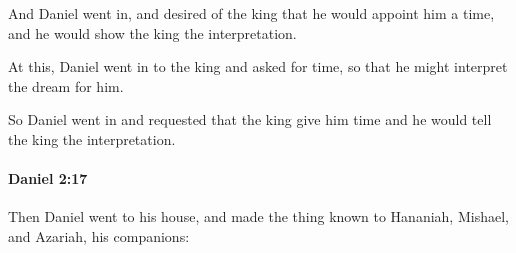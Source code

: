 			\begin{versebox}
					\item[BHS] 
					\item[LXX] 
					\item[ASV] And Daniel went in, and desired of the king that he would appoint him a time, and he would show the king the interpretation.
					\item[NIV] At this, Daniel went in to the king and asked for time, so that he might interpret the dream for him.
					\item[NRSV] So Daniel went in and requested that the king give him time and he would tell the king the interpretation.
			\end{versebox}

		\paragraph{Daniel 2:17} %
			\label{DANIEL-2-17}

			Then Daniel went to his house, and made the thing known to Hananiah, Mishael, and Azariah, his companions:

